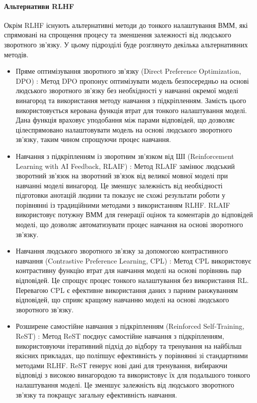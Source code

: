 \paragraph{Альтернативи RLHF}

Окрім RLHF існують альтернативні методи до тонкого налаштування ВММ, які спрямовані на спрощення процесу та зменшення залежності від людського зворотного зв'язку. У цьому підрозділі буде розглянуто декілька альтернативних методів.

\begin{itemize}
    \item {Пряме оптимізування зворотного зв'язку (Direct Preference Optimization, DPO)} \cite{rafailov2024directpreferenceoptimizationlanguage}: Метод DPO пропонує оптимізувати модель безпосередньо на основі людського зворотного зв'язку без необхідності у навчанні окремої моделі винагород та використання методу навчання з підкріпленням. Замість цього використовується керована функція втрат для тонкого налаштування моделі. Дана функція враховує уподобання між парами відповідей, що дозволяє цілеспрямовано налаштовувати модель на основі людського зворотного зв'язку, таким чином спрощуючи процес навчання.

    \item {Навчання з підкріпленням із зворотним зв'язком від ШІ (Reinforcement Learning with AI Feedback, RLAIF)} \cite{lee2024rlaifvsrlhfscaling}: Метод RLAIF замінює людський зворотний зв'язок на зворотний зв'язок від великої мовної моделі при навчанні моделі винагород. Це зменшує залежність від необхідності підготовки анотацій людини та показує не схожі результати роботи у порівнянні із традиційними методами з використанням RLHF. RLAIF використовує потужну ВММ для генерації оцінок та коментарів до відповідей моделі, що дозволяє автоматизувати процес навчання на основі зворотного зв'язку.

    \item {Навчання людського зворотного зв'язку за допомогою контрастивного навчання (Contrastive Preference Learning, CPL)} \cite{hejna2024contrastivepreferencelearninglearning}: Метод CPL використовує контрастивну функцію втрат для навчання моделі на основі порівнянь пар відповідей. Це спрощує процес тонкого налаштування без використання RL. Перевагою CPL є ефективне використання даних з парним ранжуванням відповідей, що сприяє кращому навчанню моделі на основі людського зворотного зв'язку.

    \item {Розширене самостійне навчання з підкріпленням (Reinforced Self-Training, ReST)} \cite{gulcehre2023reinforcedselftrainingrestlanguage}: Метод ReST поєднує самостійне навчання з підкріпленням, використовуючи ітеративний підхід до відбору та тренування на найбільш якісних прикладах, що поліпшує ефективність у  порівнянні зі стандартними методами RLHF. ReST генерує нові дані для тренування, вибираючи відповіді з високою винагородою та використовує їх для подальшого тонкого налаштування моделі. Це зменшує залежність від людського зворотного зв'язку та покращує загальну ефективність навчання.
    

\end{itemize}
